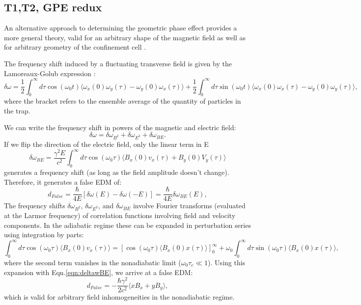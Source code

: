 \subsection{T1,T2, GPE redux}

An alternative approach to determining the geometric phase effect
provides a more general theory, valid for an arbitrary shape of the
magnetic field as well as for arbitrary geometry of the confinement
cell \cite{pignol2012electric}.

The frequency shift induced by a fluctuating transverse field is given
by the Lamoreaux-Golub expression \cite{lamoreaux2005detailed}:
%
\begin{equation}
\delta \omega = \frac{1}{2}\int_{0}^{\infty}d\tau \cos(\omega_0 t) \langle\omega_x(0) \omega_y(\tau) - \omega_y(0) \omega_x(\tau)\rangle + \frac{1}{2}\int_{0}^{\infty}d\tau \sin(\omega_0 t) \langle\omega_x(0) \omega_x(\tau) - \omega_y(0) \omega_y(\tau)\rangle ,
\end{equation}
%
where the bracket refers to the ensemble average of the quantity of
particles in the trap.

We can write the frequency shift in powers of the magnetic and electric field:
%
\begin{equation}
\delta \omega = \delta \omega_{B^2} + \delta \omega_{E^2} + \delta \omega_{BE}.
\end{equation}
%
If we flip the direction of the electric field, only the linear term in E 
%
\begin{equation}
\label{eqn:deltawBE}
\delta \omega_{BE} = \frac{\gamma^2 E}{c^2} \int_{0}^{\infty} d\tau \cos(\omega_0 \tau) \langle B_x(0) v_x(\tau) + B_y(0) V_y(\tau)\rangle
\end{equation}
%
generates a frequency shift (as long as the field amplitude doesn't
change).  Therefore, it generates a false EDM of:
%
\begin{equation}
d_{False} = \frac{\hbar}{4E}[\delta \omega(E) - \delta \omega (-E)] = \frac{\hbar}{4E}\delta \omega_{BE}(E) ,
\end{equation}
%
The frequency shifts $\delta \omega_{B^2}$, $\delta \omega_{E^2}$, and
$\delta \omega_{BE}$ involve Fourier transforms (evaluated at the
Larmor frequency) of correlation functions involving field and
velocity components.  In the adiabatic regime these can be expanded in
perturbation series using integration by parts:
%
\begin{equation}
\int_{0}^{\infty} d\tau \cos(\omega_0 \tau)\langle B_x(0) v_x(\tau)\rangle = [\cos(\omega_0 \tau)\langle B_x(0)x(\tau)\rangle]_{0}^{\infty} + \omega_0 \int_{0}^{\infty} d\tau \sin(\omega_0 \tau)\langle B_x(0) x(\tau)\rangle ,
\end{equation}
%
where the second term vanishes in the nonadiabatic limit
($\omega_0 \tau_c \ll 1$).  Using this expansion with
Eqn.\ref{eqn:deltawBE}, we arrive at a false EDM:
%
\begin{equation}
d_{False} = - \frac{\hbar \gamma^2}{2 c^2} \langle x B_x + y B_y \rangle,
\end{equation}
%
which is valid for arbitrary field inhomogeneities in the nonadiabatic
regime.


